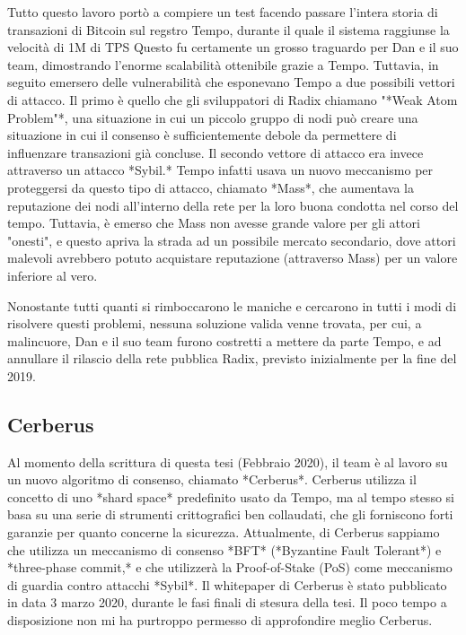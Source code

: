Tutto questo lavoro portò a compiere un test facendo passare l'intera storia di transazioni di Bitcoin sul regstro Tempo, durante il quale il sistema raggiunse la velocità di 1M di TPS Questo fu certamente un grosso traguardo per Dan e il suo team, dimostrando l'enorme scalabilità ottenibile grazie a Tempo. Tuttavia, in seguito emersero delle vulnerabilità che esponevano Tempo a due possibili vettori di attacco. Il primo è quello che gli sviluppatori di Radix chiamano "*Weak Atom Problem"*, una situazione in cui un piccolo gruppo di nodi può creare una situazione in cui il consenso è sufficientemente debole da permettere di influenzare transazioni già concluse. Il secondo vettore di attacco era invece attraverso un attacco *Sybil.* Tempo infatti usava un nuovo meccanismo per proteggersi da questo tipo di attacco, chiamato *Mass*, che aumentava la reputazione dei nodi all'interno della rete per la loro buona condotta nel corso del tempo. Tuttavia, è emerso che Mass non avesse grande valore per gli attori "onesti", e questo apriva la strada ad un possibile mercato secondario, dove attori malevoli avrebbero potuto acquistare reputazione  (attraverso Mass) per un valore inferiore al vero.

Nonostante tutti quanti si rimboccarono le maniche e cercarono in tutti i modi di risolvere questi problemi, nessuna soluzione valida venne trovata, per cui, a malincuore, Dan e il suo team furono costretti a mettere da parte Tempo, e ad annullare il rilascio della rete pubblica Radix, previsto inizialmente per la fine del 2019.

\subsection{Cerberus}

Al momento della scrittura di questa tesi (Febbraio 2020), il team è al lavoro su un nuovo algoritmo di consenso, chiamato *Cerberus*. Cerberus utilizza il concetto di uno *shard space* predefinito usato da Tempo, ma al tempo stesso si basa su una serie di strumenti crittografici ben collaudati, che gli forniscono forti garanzie per quanto concerne la sicurezza. Attualmente, di Cerberus sappiamo che utilizza un meccanismo di consenso *BFT* (*Byzantine Fault Tolerant*) e *three-phase commit,* e che utilizzerà la Proof-of-Stake (PoS) come meccanismo di guardia contro attacchi *Sybil*. Il whitepaper di Cerberus è stato pubblicato in data 3 marzo 2020, durante le fasi finali di stesura della tesi. Il poco tempo a disposizione non mi ha purtroppo permesso di approfondire meglio Cerberus.

